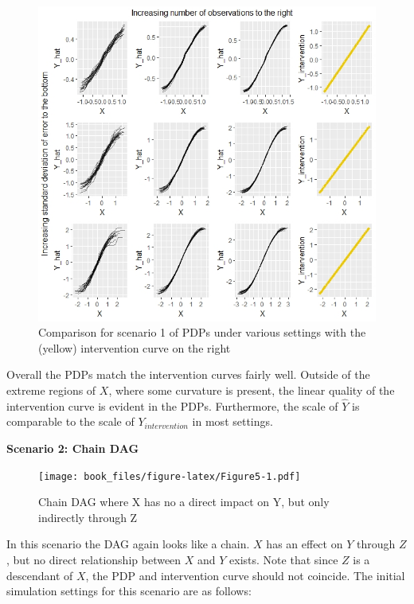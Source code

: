 \documentclass[
]{krantz}
\begin{document}
\begin{figure}

\includegraphics[width=1\linewidth]{images/scenario1_all} \hfill{}

\caption{Comparison for scenario 1 of PDPs under various settings with the (yellow) intervention curve on the right}\label{fig:Figure4}
\end{figure}

Overall the PDPs match the intervention curves fairly well. Outside of the extreme regions of \(X\), where some curvature is present, the linear quality of the intervention curve is evident in the PDPs. Furthermore, the scale of \(\hat{Y}\) is comparable to the scale of \(Y_{intervention}\) in most settings.

\textbf{Scenario 2: Chain DAG}

\begin{figure}
\centering
\texttt{[image: book\_files/figure-latex/Figure5-1.pdf]}
\caption{\label{fig:Figure5}Chain DAG where X has no a direct impact on Y, but only indirectly through Z}
\end{figure}

In this scenario the DAG again looks like a chain. \(X\) has an effect on \(Y\) through \(Z\), but no direct relationship between \(X\) and \(Y\) exists. Note that since \(Z\) is a descendant of \(X\), the PDP and intervention curve should not coincide. The initial simulation settings for this scenario are as follows:
\end{document}
